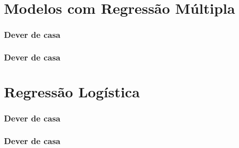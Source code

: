 \documentclass[graphics,14pt]{beamer}
\begin{document}
\section{Modelos com Regressão Múltipla}
\begin{frame}[t,fragile=singleslide]
\frametitle{Dever de casa}
\end{frame}
\begin{frame}[t,fragile=singleslide]
\frametitle{Dever de casa}
\end{frame}
\section{Regressão Logística}
\begin{frame}[t,fragile=singleslide]
\frametitle{Dever de casa}
\end{frame}
\begin{frame}[t,fragile=singleslide]
\frametitle{Dever de casa}
\end{frame}
\end{document}
